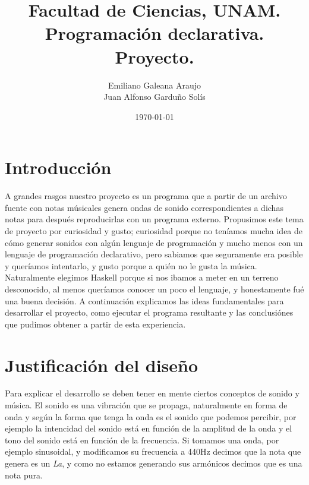 \documentclass[10pt,a4paper]{article}
\title{Facultad de Ciencias, UNAM.\\Programación declarativa.\\ Proyecto.}
\author{Emiliano Galeana Araujo\\ Juan Alfonso Garduño Solís}
\date{\today}
\begin{document}
\maketitle
\section{Introducción}
\noindent A grandes rasgos nuestro proyecto es un programa que a partir de un
archivo fuente con notas músicales genera ondas de sonido correspondientes a
dichas notas  para después reproducirlas con un programa externo. Propusimos este
tema de proyecto por curiosidad y gusto; curiosidad porque no teníamos mucha idea
de cómo generar sonidos con algún lenguaje de programación y mucho menos con un
lenguaje de programación declarativo, pero sabiamos que seguramente era posible y
queríamos intentarlo, y gusto porque a quién no le gusta la música. Naturalmente
elegimos Haskell porque si nos ibamos a meter en un terreno desconocido, al menos
queríamos conocer un poco el lenguaje, y honestamente fué una buena decisión. A
continuación explicamos las ideas fundamentales para desarrollar el proyecto,
como ejecutar el programa resultante y las conclusiónes que pudimos obtener a
partir de esta experiencia.

\section{Justificación del diseño}
\noindent Para explicar el desarrollo se deben tener en mente ciertos conceptos
de sonido y música. El sonido es una vibración que se propaga, naturalmente en
forma de onda y según la forma que tenga la onda es el sonido que podemos
percibir, por ejemplo la intencidad del sonido está en función de la amplitud
de la onda y el tono del sonido está en función de la frecuencia. Si tomamos una
onda, por ejemplo sinusoidal, y modificamos su frecuencia a 440Hz decimos que la
nota que genera es un \textit{La}, y como no estamos generando sus armónicos
decimos que es una nota pura.
\end{document}
